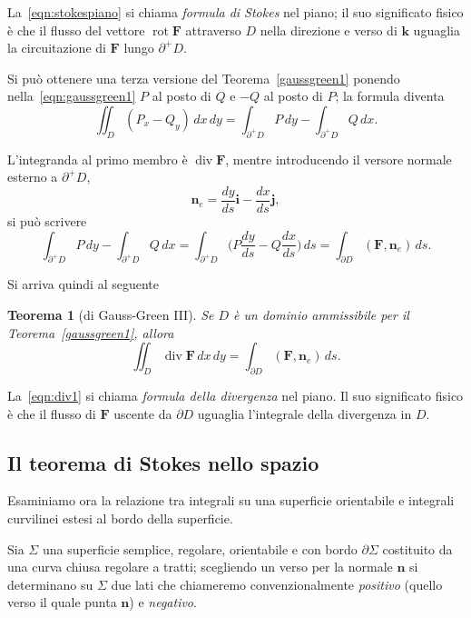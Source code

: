 \documentclass[a4paper]{book}
\DeclareMathOperator{\rot}{rot}
\DeclareMathOperator{\divg}{div}
\numberwithin{equation}{section}
\theoremstyle{plain}
\newtheorem{teor}{Teorema}[section]
\theoremstyle{definition}
\theoremstyle{remark}
\renewcommand{\vec}{\boldsymbol}
\theoremstyle{example}
\begin{document}
	La~\eqref{eqn:stokespiano} si chiama \emph{formula di Stokes} nel piano; il suo significato fisico è che il flusso del vettore $\rot\vec{F}$ attraverso $D$ nella direzione e verso di $\vec{k}$ uguaglia la circuitazione di $\vec{F}$ lungo $\partial^+D$.

	Si può ottenere una terza versione del Teorema~\ref{gaussgreen1} ponendo nella~\eqref{eqn:gaussgreen1} $P$ al posto di $Q$ e $-Q$ al posto di $P$; la formula diventa
		\begin{equation}
			\iint_D (P_x - Q_y) \, dx \, dy = \int_{\partial^+ D} P \, dy - \int_{\partial^+ D} Q \, dx.
		\end{equation}

		L'integranda al primo membro è $\divg \vec{F}$, mentre introducendo il versore normale esterno a $\partial^+ D$,
			\begin{equation*}
				\vec{n}_e = \frac{dy}{ds}\vec{i} - \frac{dx}{ds}\vec{j},
			\end{equation*}
		si può scrivere
			\begin{equation*}
				\int_{\partial ^+ D}P \, dy - \int_{\partial^+D}Q \, dx = \int_{\partial^+D}\biggl( P\frac{dy}{ds} - Q\frac{dx}{ds} \biggr) \, ds = \int_{\partial D}(\vec{F}, \vec{n}_e)\, ds.
			\end{equation*}

Si arriva quindi al seguente
	\begin{teor}[di Gauss-Green III]
		Se $D$ è un dominio ammissibile per il Teorema~\ref{gaussgreen1}, allora
			\begin{equation}
				\label{eqn:div1}
				\iint_D \divg \vec{F} \, dx \, dy = \int_{\partial D} (\vec{F}, \vec{n}_e)\, ds.
			\end{equation}
	\end{teor}

La~\eqref{eqn:div1} si chiama \emph{formula della divergenza} nel piano. Il suo significato fisico è che il flusso di $\vec{F}$ uscente da $\partial D$ uguaglia l'integrale della divergenza in $D$.

\subsection{Il teorema di Stokes nello spazio}
Esaminiamo ora la relazione tra integrali su una superficie orientabile e integrali curvilinei estesi al bordo della superficie.

Sia $\Sigma$ una superficie semplice, regolare, orientabile e con bordo $\partial \Sigma$ costituito da una curva chiusa regolare a tratti; scegliendo un verso per la normale $\vec{n}$ si determinano su $\Sigma$ due lati che chiameremo convenzionalmente \emph{positivo} (quello verso il quale punta $\vec{n}$) e \emph{negativo}.
\end{document}
